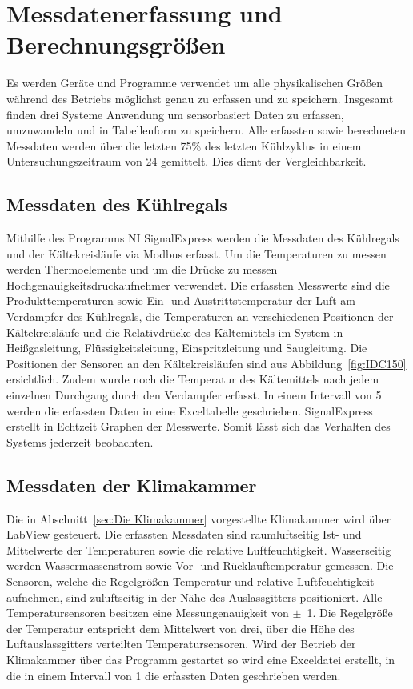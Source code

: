 \section{Messdatenerfassung und Berechnungsgrößen}
\label{sec:Erfassung von Messdaten}

Es werden Geräte und Programme verwendet um alle physikalischen Größen während des Betriebs möglichst genau zu erfassen und zu speichern. Insgesamt finden drei Systeme Anwendung um sensorbasiert Daten zu erfassen, umzuwandeln und in Tabellenform zu speichern. Alle erfassten sowie berechneten Messdaten werden über die letzten \unit{75}{\%} des letzten Kühlzyklus in einem Untersuchungszeitraum von \unit{24}{\hour} gemittelt. Dies dient der Vergleichbarkeit.


\subsection{Messdaten des Kühlregals}
\label{subsec:Messdaten der Klimakammer}

Mithilfe des Programms NI SignalExpress werden die Messdaten des Kühlregals und der Kältekreisläufe via Modbus erfasst. Um die Temperaturen zu messen werden Thermoelemente  und um die Drücke zu messen Hochgenauigkeitsdruckaufnehmer verwendet. Die erfassten Messwerte sind die Produkttemperaturen sowie Ein- und Austrittstemperatur der Luft am Verdampfer des Kühlregals, die Temperaturen an verschiedenen Positionen der Kältekreisläufe und die Relativdrücke des Kältemittels im System in Heißgasleitung, Flüssigkeitsleitung, Einspritzleitung und Saugleitung. Die Positionen der Sensoren an den Kältekreisläufen sind aus Abbildung~\ref{fig:IDC150} ersichtlich. Zudem wurde noch die Temperatur des Kältemittels nach jedem einzelnen Durchgang durch den Verdampfer erfasst.
In einem Intervall von \unit{5}{\second} werden die erfassten Daten in eine Exceltabelle geschrieben. SignalExpress erstellt in Echtzeit Graphen der Messwerte. Somit lässt sich das Verhalten des Systems jederzeit beobachten.

\subsection{Messdaten der Klimakammer}
\label{subsec:Messdaten der Klimakammer}

Die in Abschnitt~\ref{sec:Die Klimakammer} vorgestellte Klimakammer wird über LabView gesteuert. Die erfassten Messdaten sind raumluftseitig Ist- und Mittelwerte der Temperaturen sowie die relative Luftfeuchtigkeit. Wasserseitig werden Wassermassenstrom sowie Vor- und Rücklauftemperatur gemessen. 
Die Sensoren, welche die Regelgrößen Temperatur und relative Luftfeuchtigkeit aufnehmen, sind zuluftseitig in der Nähe des Auslassgitters positioniert. Alle Temperatursensoren besitzen eine Messungenauigkeit von $\pm$~\unit{1}{\kelvin}. Die Regelgröße der Temperatur entspricht dem Mittelwert von drei, über die Höhe des Luftauslassgitters verteilten Temperatursensoren. Wird der Betrieb der Klimakammer über das Programm gestartet so wird eine Exceldatei erstellt, in die in einem Intervall von \unit{1}{\second} die erfassten Daten geschrieben werden.



